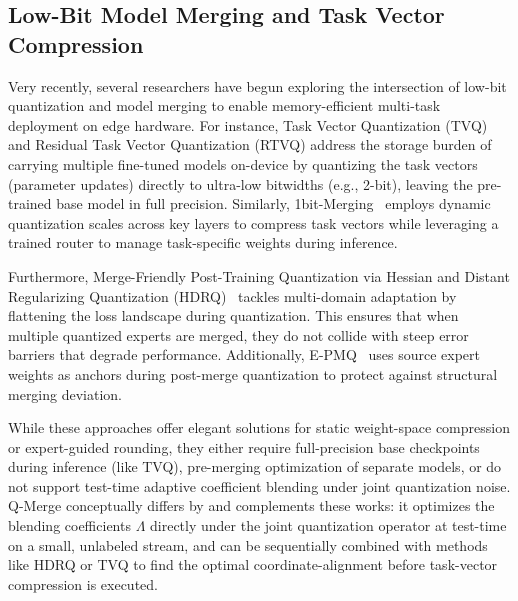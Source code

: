 \subsection{Low-Bit Model Merging and Task Vector Compression}
Very recently, several researchers have begun exploring the intersection of low-bit quantization and model merging to enable memory-efficient multi-task deployment on edge hardware. For instance, Task Vector Quantization (TVQ)~\cite{tvq2025} and Residual Task Vector Quantization (RTVQ) address the storage burden of carrying multiple fine-tuned models on-device by quantizing the task vectors (parameter updates) directly to ultra-low bitwidths (e.g., 2-bit), leaving the pre-trained base model in full precision. Similarly, 1bit-Merging~\cite{onebitmerging2025} employs dynamic quantization scales across key layers to compress task vectors while leveraging a trained router to manage task-specific weights during inference.

Furthermore, Merge-Friendly Post-Training Quantization via Hessian and Distant Regularizing Quantization (HDRQ)~\cite{hdrq2025} tackles multi-domain adaptation by flattening the loss landscape during quantization. This ensures that when multiple quantized experts are merged, they do not collide with steep error barriers that degrade performance. Additionally, E-PMQ~\cite{epmq2026} uses source expert weights as anchors during post-merge quantization to protect against structural merging deviation.

While these approaches offer elegant solutions for static weight-space compression or expert-guided rounding, they either require full-precision base checkpoints during inference (like TVQ), pre-merging optimization of separate models, or do not support test-time adaptive coefficient blending under joint quantization noise. Q-Merge conceptually differs by and complements these works: it optimizes the blending coefficients $\Lambda$ directly under the joint quantization operator at test-time on a small, unlabeled stream, and can be sequentially combined with methods like HDRQ or TVQ to find the optimal coordinate-alignment before task-vector compression is executed.